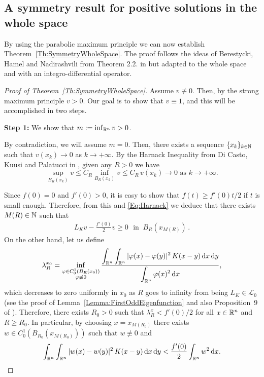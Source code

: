 
\subsection{A symmetry result for positive solutions in the whole space}


By using the parabolic maximum principle we can now establish Theorem~\ref{Th:SymmetryWholeSpace}.
The proof follows the ideas of Berestycki, Hamel and Nadirashvili from Theorem 2.2. in
\cite{BerestyckiHamelNadi} but adapted to the whole space and with an integro-differential
operator.


\begin{proof}[Proof of Theorem~\ref{Th:SymmetryWholeSpace}]


Assume $v\not\equiv 0$. Then, by the strong maximum principle $v>0$. Our goal is to show that $v
\equiv 1$, and this will be accomplished in two steps.

\textbf{Step 1:} We show that $m:=\inf_{\mathbb{R}^n} v >0$.

By contradiction, we will assume $m=0$. Then, there exists a sequence $\{x_k\}_{k\in\mathbb{N}}$ such that
$v(x_k)\rightarrow 0$ as $k \rightarrow +\infty$. By the Harnack Inequality from Di Casto, Kuusi
and Palatucci in \cite{DiCastoKuusiPalatucci}, given any $R>0$ we have 
\begin{equation}
\label{Eq:Harnack}
\sup_{B_R(x_k)}v \leq C_R \inf_{B_R(x_k)}v \leq C_R \, v(x_k) \rightarrow 0 \,\,\text{as}\,\, k\rightarrow +\infty.
\end{equation}


Since $f(0) = 0 $ and $f'(0)>0$, it is easy to show that $f(t)\geq f'(0)t/2$ if $t$ is small
enough. Therefore, from this and \eqref{Eq:Harnack}  we deduce that there exists $M(R)\in\mathbb{N}$ such
that
\begin{align}
\label{Eq:WholeSpace2}
L_K  v - \frac{f'(0)}{2}v \geq 0 \,\,\textrm{ in }\ B_R(x_{M(R)})\,.
\end{align}
On the other hand, let us define
$$ \lambda_R^{x_0} = \inf_{\substack{\varphi\in C^1_0(B_R(x_0))\\ \varphi\not\equiv 0}} \frac{\displaystyle \int_{\mathbb{R}^n}\int_{\mathbb{R}^n}|\varphi(x)-\varphi(y)|^2\,K(x-y) \,\mathrm{d} x \,\mathrm{d} y}{\displaystyle \int_{\mathbb{R}^n}\varphi(x)^2 \,\mathrm{d} x}, $$
which decreases to zero uniformly in $x_0$ as $R$ goes to infinity from being $L_K \in\mathcal{L}_0$ (see the proof of Lemma~\ref{Lemma:FirstOddEigenfunction} and also Proposition~9 of \cite{ServadeiValdinoci}). Therefore, there exists $R_0>0$ such that $ \lambda_R^x < f'(0)/2$ for all $x\in \mathbb{R}^n$ and $R\geq R_0$. In particular, by choosing $x=x_{M(R_0)}$ there exists $w\in C^1_0(B_{R_0}(x_{M(R_0)}))$ such that $w\not\equiv 0$ and
\begin{equation}
\label{Eq:Eigenfunction}
\int_{\mathbb{R}^n}\int_{\mathbb{R}^n}|w(x)-w(y)|^2\,K(x-y) \,\mathrm{d} x \,\mathrm{d} y < \frac{f'(0)}{2}\int_{\mathbb{R}^n}w^2 \,\mathrm{d} x.
\end{equation}


\end{proof}
